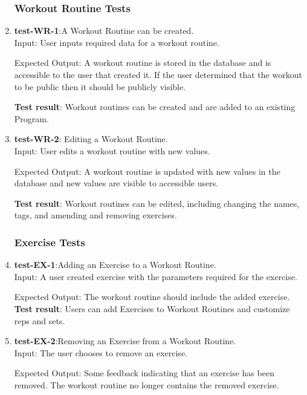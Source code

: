 \documentclass[12pt, titlepage]{article}
\begin{document}
\begin{enumerate}
   
\subsubsection{Workout Routine Tests}
    \item{\textbf{test-WR-1}}:A Workout Routine can be created.\\
    Input: User inputs required data for a workout routine.
	
    Expected Output: A workout routine is stored in the database and is accessible to the user that created it. If the user determined that the workout to be public then it should be publicly visible.
    
    \textbf{Test result}: Workout routines can be created and are added to an existing Program.
   
    \item{\textbf{test-WR-2}}: Editing a Workout Routine.\\
    Input: User edits a workout routine with new values.
	
    Expected Output: A workout routine is updated with new values in the database and new values are visible to accessible users.
    
    \textbf{Test result}: Workout routines can be edited, including changing the names, tags, and amending and removing exercises.
   
\subsubsection{Exercise Tests}
    \item{\textbf{test-EX-1}}:Adding an Exercise to a Workout Routine.\\
    Input: A user created exercise with the parameters required for the exercise.

    Expected Output: The workout routine should include the added exercise.
    \textbf{Test result}: Users can add Exercises to Workout Routines and customize reps and sets.
   
    \item{\textbf{test-EX-2}}:Removing an Exercise from a Workout Routine.\\
    Input: The user chooses to remove an exercise.
	
    Expected Output: Some feedback indicating that an exercise has been removed. The workout routine no longer contains the removed exercise.
    

\end{enumerate}
\end{document}
